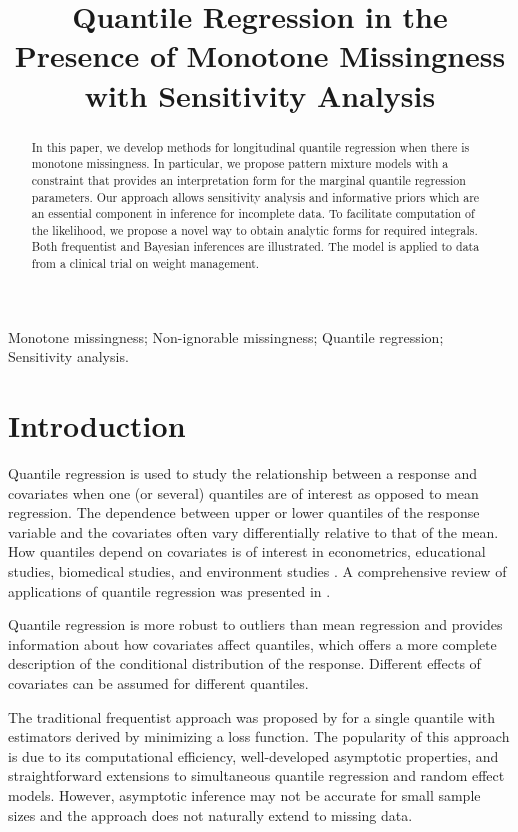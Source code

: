 \documentclass[useAMS,usenatbib,referee]{enar}
\title[ ]{Quantile Regression in the Presence of Monotone Missingness with Sensitivity Analysis}
\begin{document}
\label{firstpage}

\begin{abstract}
  In this paper, we develop methods for longitudinal quantile
  regression when there is monotone missingness. In particular, we
  propose pattern mixture models with a constraint that provides an
  interpretation form for the marginal quantile regression
  parameters. Our approach allows sensitivity analysis and informative
  priors which are an essential component in inference for incomplete
  data. To facilitate computation of the likelihood, we propose a
  novel way to obtain analytic forms for required integrals. Both
  frequentist and Bayesian inferences are illustrated. The model is
  applied to data from a clinical trial on weight management.
\end{abstract}

\begin{keywords}
  Monotone missingness; Non-ignorable missingness; Quantile regression;
  Sensitivity analysis.
\end{keywords}

\maketitle

\section{Introduction}

Quantile regression is used to study the relationship between a
response and covariates when one (or several) quantiles are of
interest as opposed to mean regression.  The dependence between upper
or lower quantiles of the response variable and the covariates often
vary differentially relative to that of the mean. How quantiles depend
on covariates is of interest in econometrics, educational studies,
biomedical studies, and environment studies \citep{yu2001,
  buchinsky1994,buchinsky1998,he1998, koenker1999,wei2006,yu2003}. A
comprehensive review of applications of quantile regression was
presented in \citet{koenker2005}.

Quantile regression is more robust to outliers than mean regression
and provides information about how covariates affect quantiles, which
offers a more complete description of the conditional distribution of
the response. Different effects of covariates can be assumed for
different quantiles.

The traditional frequentist approach was proposed by
\citet{koenker1978} for a single quantile with estimators derived by
minimizing a loss function. The popularity of this approach is due to
its computational efficiency, well-developed asymptotic properties,
and straightforward extensions to simultaneous quantile regression and
random effect models. However, asymptotic inference may not be
accurate for small sample sizes and the approach does not naturally
extend to missing data.
\end{document}
